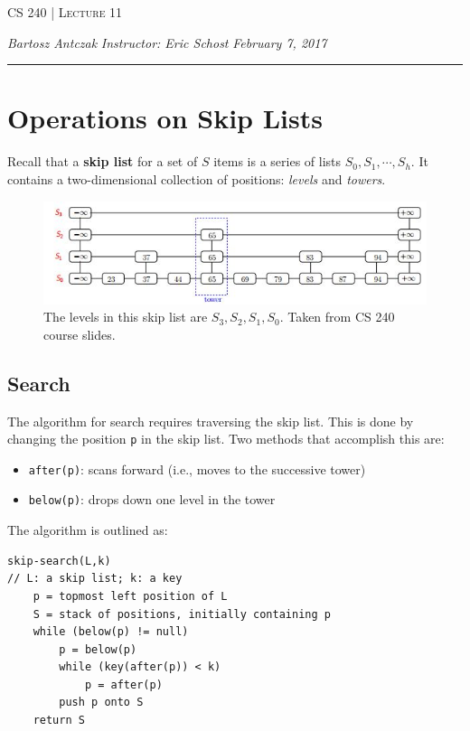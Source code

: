 \documentclass{report}
\newcommand{\lectureNum}{11}
\newcommand{\curDate}{February 7, 2017}
\newcommand{\course}{CS 240}
\begin{document}
\begin{center}
\begin{Large}
\textsc{\course{} | Lecture \lectureNum{}}
\end{Large}
\end{center} 
\noindent \textit{Bartosz Antczak} \hfill
\textit{Instructor: Eric Schost} \hfill
\textit{\curDate{}}
\rule{\textwidth}{0.4pt}

\section{Operations on Skip Lists}
Recall that a \textbf{skip list} for a set of $S$ items is a series of lists $S_0, S_1, \cdots, S_h$. It contains a two-dimensional collection of positions: \textit{levels} and \textit{towers}.
\begin{figure}[ht]
\begin{center}
\includegraphics[scale=0.8]{skip-list.jpg}
\end{center}
\caption{The levels in this skip list are $S_3, S_2, S_1, S_0$. Taken from CS 240 course slides.}
\end{figure}
\subsection{Search}
The algorithm for search requires traversing the skip list. This is done by changing the position \texttt{p} in the skip list. Two methods that accomplish this are:
\begin{itemize}
\item \texttt{after(p)}: scans forward (i.e., moves to the successive tower)
\item \texttt{below(p)}: drops down one level in the tower
\end{itemize}
The algorithm is outlined as:
\begin{lstlisting}
skip-search(L,k)
// L: a skip list; k: a key
	p = topmost left position of L
	S = stack of positions, initially containing p
	while (below(p) != null)
		p = below(p)
		while (key(after(p)) < k)
			p = after(p)
		push p onto S
	return S
\end{lstlisting}
\end{document}
